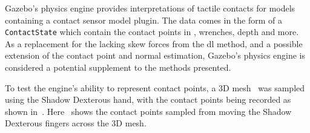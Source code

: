 Gazebo's physics engine provides interpretations of tactile contacts for models containing a contact sensor model plugin. The data comes in the form of a \texttt{ContactState} which contain the contact points in , wrenches, depth and more. As a replacement for the lacking skew forces from the \gls{dl} method, and a possible extension of the contact point and normal estimation, Gazebo's physics engine is considered a potential supplement to the methods presented. \medskip

To test the engine's ability to represent contact points, a 3D mesh~\cite{stanford-bunny} was sampled using the Shadow Dexterous hand, with the contact points being recorded as shown in~. Here~ shows the contact points sampled from moving the Shadow Dexterous fingers across the 3D mesh.

